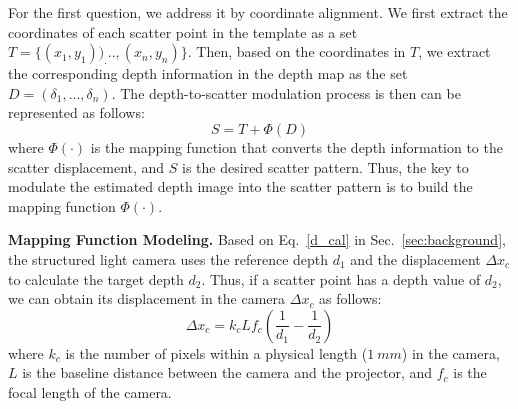  


For the first question, we address it by coordinate alignment. We first extract the coordinates of each scatter point in the template as a set $T = \{(x_1, y_1))_ ..., (x_n, y_n)\}$. Then, based on the coordinates in $T$, we extract the corresponding depth information in the depth map as the set $D = (\delta_1, ..., \delta_n)$. 
The depth-to-scatter modulation process is then can be represented as follows:
\begin{equation}
	S = T + \Phi(D)
	\label{modulation_process}
\end{equation}
where $\Phi(\cdot)$ is the mapping function that converts the depth information to the scatter displacement, and $S$ is the desired scatter pattern.  
Thus, the key to modulate the estimated depth image into the scatter pattern is to build the mapping function $\Phi(\cdot)$. 

\textbf{Mapping Function Modeling.} 
Based on Eq.~\ref{d_cal} in Sec.~\ref{sec:background}, the structured light camera uses the reference depth $d_1$ and the displacement $\Delta x_c$ to calculate the target depth $d_2$. Thus, if a scatter point has a depth value of $d_2$, we can obtain its displacement in the camera $\Delta x_c$ as follows:
\begin{equation}
	\Delta x_c = k_cLf_c(\frac{1}{d_1} - \frac{1}{d_2}) 
	\label{d_to_xc}
\end{equation}
where $k_c$ is the number of pixels within a physical length ($1~mm$) in the camera, $L$ is the baseline distance between the camera and the projector, and $f_c$ is the focal length of the camera.

